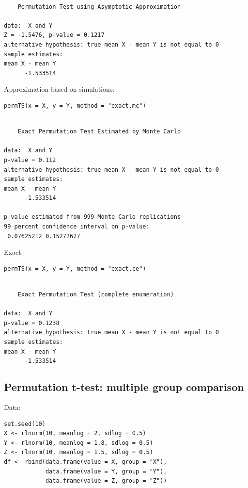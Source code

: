 \documentclass{article}
\begin{document}
\begin{verbatim}

	Permutation Test using Asymptotic Approximation

data:  X and Y
Z = -1.5476, p-value = 0.1217
alternative hypothesis: true mean X - mean Y is not equal to 0
sample estimates:
mean X - mean Y 
      -1.533514
\end{verbatim}


Approximation based on simulations:
\lstset{language=r,label= ,caption= ,captionpos=b,numbers=none}
\begin{lstlisting}
permTS(x = X, y = Y, method = "exact.mc")
\end{lstlisting}

\begin{verbatim}

	Exact Permutation Test Estimated by Monte Carlo

data:  X and Y
p-value = 0.112
alternative hypothesis: true mean X - mean Y is not equal to 0
sample estimates:
mean X - mean Y 
      -1.533514 

p-value estimated from 999 Monte Carlo replications
99 percent confidence interval on p-value:
 0.07625212 0.15272627
\end{verbatim}

Exact:
\lstset{language=r,label= ,caption= ,captionpos=b,numbers=none}
\begin{lstlisting}
permTS(x = X, y = Y, method = "exact.ce")
\end{lstlisting}

\begin{verbatim}

	Exact Permutation Test (complete enumeration)

data:  X and Y
p-value = 0.1238
alternative hypothesis: true mean X - mean Y is not equal to 0
sample estimates:
mean X - mean Y 
      -1.533514
\end{verbatim}

\subsection{Permutation t-test: multiple group comparison}
\label{sec:org48c5a18}
Data:
\lstset{language=r,label= ,caption= ,captionpos=b,numbers=none}
\begin{lstlisting}
set.seed(10)
X <- rlnorm(10, meanlog = 2, sdlog = 0.5)
Y <- rlnorm(10, meanlog = 1.8, sdlog = 0.5)
Z <- rlnorm(10, meanlog = 1.5, sdlog = 0.5)
df <- rbind(data.frame(value = X, group = "X"),
            data.frame(value = Y, group = "Y"),
            data.frame(value = Z, group = "Z"))
\end{lstlisting}
\end{document}
